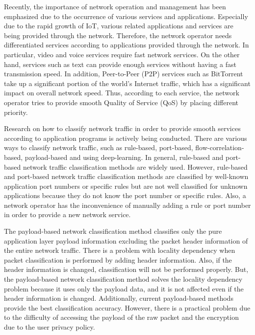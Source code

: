 Recently, the importance of network operation and management has been emphasized due to the occurrence of various services and applications.
Especially due to the rapid growth of IoT, various related applications and services are being provided through the network.
Therefore, the network operator needs differentiated services according to applications provided through the network.
In particular, video and voice services require fast network services.
On the other hand, services such as text can provide enough services without having a fast transmission speed.
In addition, Peer-to-Peer (P2P) services such as BitTorrent take up a significant portion of the world's Internet traffic, which has a significant impact on overall network speed.
Thus, according to each service, the network operator tries to provide smooth Quality of Service (QoS) by placing different priority.

Research on how to classify network traffic in order to provide smooth services according to application programs is actively being conducted.
There are various ways to classify network traffic, such as rule-based, port-based, flow-correlation-based, payload-based and using deep-learning.
In general, rule-based and port-based network traffic classification methods are widely used.
However, rule-based and port-based network traffic classification methods are classified by well-known application port numbers or specific rules but are not well classified for unknown applications because they do not know the port number or specific rules.
Also, a network operator has the inconvenience of manually adding a rule or port number in order to provide a new network service.

The payload-based network classification method classifies only the pure application layer payload information excluding the packet header information of the entire network traffic.
There is a problem with locality dependency when packet classification is performed by adding header information.
Also, if the header information is changed, classification will not be performed properly.
But, the payload-based network classification method solves the locality dependency problem because it uses only the payload data, and it is not affected even if the header information is changed.
Additionally, current payload-based methods provide the best classification accuracy.
However, there is a practical problem due to the difficulty of accessing the payload of the raw packet and the encryption due to the user privacy policy.

